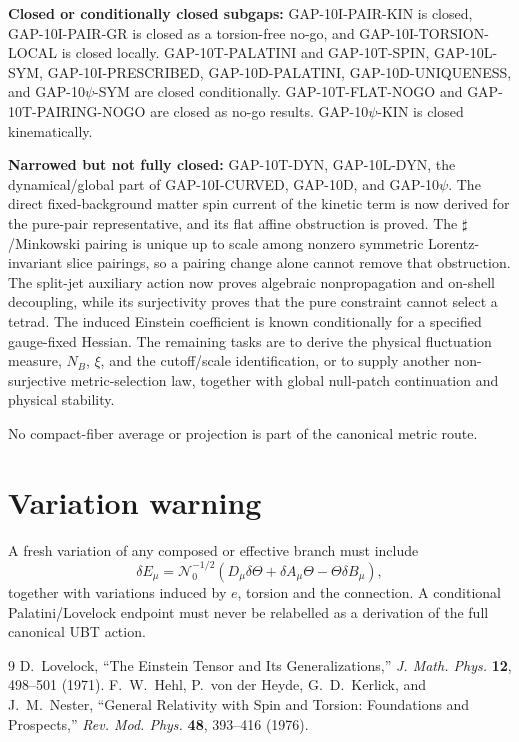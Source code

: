 \documentclass[11pt,a4paper]{article}
\begin{document}
\begin{tcolorbox}[colback=green!6!white,colframe=green!55!black,title=Current action-level ledger]
\textbf{Closed or conditionally closed subgaps:}
GAP-10I-PAIR-KIN is closed, GAP-10I-PAIR-GR is closed as a torsion-free
no-go, and GAP-10I-TORSION-LOCAL is closed locally.
GAP-10T-PALATINI and GAP-10T-SPIN, GAP-10L-SYM, GAP-10I-PRESCRIBED,
GAP-10D-PALATINI, GAP-10D-UNIQUENESS, and GAP-10$\psi$-SYM are closed
conditionally.  GAP-10T-FLAT-NOGO and GAP-10T-PAIRING-NOGO are closed as
no-go results.  GAP-10$\psi$-KIN is closed kinematically.

\medskip
\textbf{Narrowed but not fully closed:}
GAP-10T-DYN, GAP-10L-DYN, the dynamical/global part of GAP-10I-CURVED,
GAP-10D, and GAP-10$\psi$.  The direct fixed-background matter spin current
of the kinetic term is now derived for the pure-pair representative, and its
flat affine obstruction is proved.  The $\sharp$/Minkowski pairing is unique
up to scale among nonzero symmetric Lorentz-invariant slice pairings, so a
pairing change alone cannot remove that obstruction.  The split-jet auxiliary action now proves algebraic nonpropagation and on-shell
decoupling, while its surjectivity proves that the pure constraint cannot
select a tetrad.  The induced Einstein coefficient is known conditionally for
a specified gauge-fixed Hessian.  The remaining tasks are to derive the
physical fluctuation measure, $N_B$, $\xi$, and the cutoff/scale identification,
or to supply another non-surjective metric-selection law, together with global
null-patch continuation and physical stability.

\medskip
No compact-fiber average or projection is part of the canonical metric route.
\end{tcolorbox}

\section{Variation warning}
A fresh variation of any composed or effective branch must include
\[
 \delta E_\mu=\mathcal N_0^{-1/2}
 \left(D_\mu\delta\Theta+\delta A_\mu\Theta-\Theta\delta B_\mu\right),
\]
together with variations induced by $e$, torsion and the connection.  A
conditional Palatini/Lovelock endpoint must never be relabelled as a derivation
of the full canonical UBT action.

\begin{thebibliography}{9}
 D.~Lovelock, ``The Einstein Tensor and Its
Generalizations,'' \emph{J. Math. Phys.} \textbf{12}, 498--501 (1971).
 F.~W.~Hehl, P.~von der Heyde, G.~D.~Kerlick, and J.~M.~Nester,
``General Relativity with Spin and Torsion: Foundations and Prospects,''
\emph{Rev. Mod. Phys.} \textbf{48}, 393--416 (1976).
\end{thebibliography}
\end{document}
